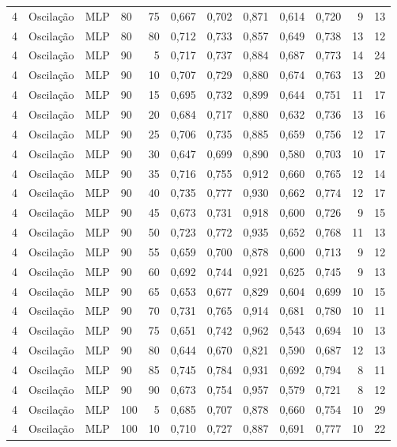 \begin{longtable}{ccclrrrrrrrr}
4 & Oscilação & MLP & 80 & 75 & 0,667 & 0,702 & 0,871 & 0,614 & 0,720 & 9 & 13 \\
4 & Oscilação & MLP & 80 & 80 & 0,712 & 0,733 & 0,857 & 0,649 & 0,738 & 13 & 12 \\
4 & Oscilação & MLP & 90 & 5 & 0,717 & 0,737 & 0,884 & 0,687 & 0,773 & 14 & 24 \\
4 & Oscilação & MLP & 90 & 10 & 0,707 & 0,729 & 0,880 & 0,674 & 0,763 & 13 & 20 \\
4 & Oscilação & MLP & 90 & 15 & 0,695 & 0,732 & 0,899 & 0,644 & 0,751 & 11 & 17 \\
4 & Oscilação & MLP & 90 & 20 & 0,684 & 0,717 & 0,880 & 0,632 & 0,736 & 13 & 16 \\
4 & Oscilação & MLP & 90 & 25 & 0,706 & 0,735 & 0,885 & 0,659 & 0,756 & 12 & 17 \\
4 & Oscilação & MLP & 90 & 30 & 0,647 & 0,699 & 0,890 & 0,580 & 0,703 & 10 & 17 \\
4 & Oscilação & MLP & 90 & 35 & 0,716 & 0,755 & 0,912 & 0,660 & 0,765 & 12 & 14 \\
4 & Oscilação & MLP & 90 & 40 & 0,735 & 0,777 & 0,930 & 0,662 & 0,774 & 12 & 17 \\
4 & Oscilação & MLP & 90 & 45 & 0,673 & 0,731 & 0,918 & 0,600 & 0,726 & 9 & 15 \\
4 & Oscilação & MLP & 90 & 50 & 0,723 & 0,772 & 0,935 & 0,652 & 0,768 & 11 & 13 \\
4 & Oscilação & MLP & 90 & 55 & 0,659 & 0,700 & 0,878 & 0,600 & 0,713 & 9 & 12 \\
4 & Oscilação & MLP & 90 & 60 & 0,692 & 0,744 & 0,921 & 0,625 & 0,745 & 9 & 13 \\
4 & Oscilação & MLP & 90 & 65 & 0,653 & 0,677 & 0,829 & 0,604 & 0,699 & 10 & 15 \\
4 & Oscilação & MLP & 90 & 70 & 0,731 & 0,765 & 0,914 & 0,681 & 0,780 & 10 & 11 \\
4 & Oscilação & MLP & 90 & 75 & 0,651 & 0,742 & 0,962 & 0,543 & 0,694 & 10 & 13 \\
4 & Oscilação & MLP & 90 & 80 & 0,644 & 0,670 & 0,821 & 0,590 & 0,687 & 12 & 13 \\
4 & Oscilação & MLP & 90 & 85 & 0,745 & 0,784 & 0,931 & 0,692 & 0,794 & 8 & 11 \\
4 & Oscilação & MLP & 90 & 90 & 0,673 & 0,754 & 0,957 & 0,579 & 0,721 & 8 & 12 \\
4 & Oscilação & MLP & 100 & 5 & 0,685 & 0,707 & 0,878 & 0,660 & 0,754 & 10 & 29 \\
4 & Oscilação & MLP & 100 & 10 & 0,710 & 0,727 & 0,887 & 0,691 & 0,777 & 10 & 22 \\

\end{longtable}
